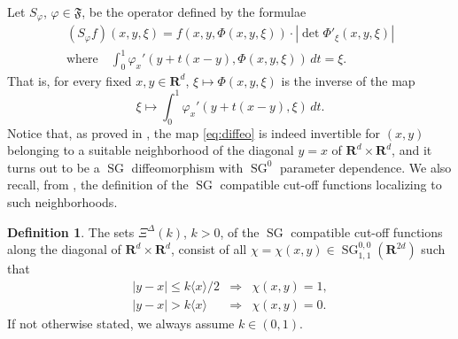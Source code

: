 \documentclass[12pt,a4paper,reqno]{amsart}
\numberwithin{equation}{section}
\numberwithin{thm}{section}
\theoremstyle{definition}
\newtheorem{defn}[thm]{Definition}
\theoremstyle{remark}
\begin{document}
\par

Let $S_{\varphi}$, ${\varphi} \in {\mathfrak{F}}$, be the operator defined by the formulae
\begin{equation}\label{SvarphiDef}
\begin{gathered}
(S_{\varphi} f)(x,y,\xi ) = f(x,y,\Phi (x,y,\xi ))\cdot \left | \det \Phi '_\xi (x,y,\xi )\right |
\\[1ex]
\text{where}\quad
\int _0^1 {\varphi} _x'(y+t(x-y),\Phi (x,y,\xi ))\, dt =\xi .
\end{gathered}
\end{equation}
That is, for every fixed $x,y\in {\mathbf R^{d}}$, $\xi \mapsto \Phi (x,y,\xi )$ is the inverse of the map
\begin{equation}\label{eq:diffeo}
\xi \mapsto \int _0^1 {\varphi} _x'(y+t(x-y),\xi )\, dt .
\end{equation}
Notice that, as proved in \cite{coriasco}, the map \eqref{eq:diffeo} is indeed invertible for $(x,y)$ belonging to a suitable
neighborhood of the diagonal $y=x$ of ${\mathbf R^{{d}}}\times{\mathbf R^{{d}}}$, and it turns out to be a ${\operatorname{SG}}$ diffeomorphism with ${\operatorname{SG}}^0$
parameter dependence. We also recall, from \cite{coriasco}, the definition of the 
${\operatorname{SG}}$ compatible cut-off functions localizing to such neighborhoods.

\par

\begin{defn}
\label{def:1.2.2}
The sets $\Xi^\Delta(k)$, $k > 0$, of the ${\operatorname{SG}}$ compatible cut-off functions
along the diagonal of ${\mathbf R^{{d}}}\times{\mathbf R^{{d}}}$, consist of all 
$\chi = \chi(x,y) \in  {\operatorname{SG}} ^{0,0}_{1,1}({\mathbf R^{{2d}}})$ such that
\begin{equation}
\label{eq:1.1.3}
\begin{array}{rcl}
        |y-x| \le k{\langle{x}\rangle}/2 & \Longrightarrow & \chi(x,y) = 1,
        \\[1ex]
        |y-x| >         k      {\langle{x}\rangle} & \Longrightarrow & \chi(x,y) = 0.
\end{array}
\end{equation}
If not otherwise stated, we always assume $k \in (0,1)$.
\end{defn}

\par
\end{document}

